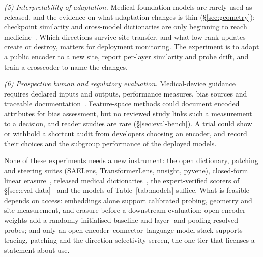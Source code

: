 \textit{(5) Interpretability of adaptation.} Medical foundation models are rarely used as released, and
the evidence on what adaptation changes is thin (\S\ref{sec:geometry}); checkpoint similarity and
cross-model dictionaries are only beginning to reach medicine~\cite{minder2025overcoming,ahmed2026medseglens}.
Which directions survive site transfer, and what low-rank updates create or destroy, matters for
deployment monitoring. The experiment is to adapt a public encoder to a new site, report per-layer
similarity and probe drift, and train a crosscoder to name the changes.

\textit{(6) Prospective human and regulatory evaluation.} Medical-device guidance requires declared
inputs and outputs, performance measures, bias sources and traceable
documentation~\cite{fda2025aiguidance,euaiact2024}. Feature-space methods could document encoded
attributes for bias assessment, but no reviewed study links such a measurement to a decision, and
reader studies are rare (\S\ref{sec:eval-bench}). A trial could show or withhold a shortcut audit from
developers choosing an encoder, and record their choices and the subgroup performance of the deployed
models.

None of these experiments needs a new instrument: the open dictionary, patching and steering
suites (SAELens, TransformerLens, nnsight, pyvene), closed-form linear
erasure~\cite{belrose2023leace}, released medical
dictionaries~\cite{abdulaal2024an,nooralahzadeh2026universal},
the expert-verified scorers of \S\ref{sec:eval-data}~\cite{kim2024transparent} and the models of
Table~\ref{tab:models} suffice. What is feasible depends on access: embeddings alone support calibrated probing, geometry and site measurement, and erasure before
a downstream evaluation; open encoder weights add a randomly initialised baseline and layer- and
pooling-resolved probes; and only an open encoder--connector--language-model stack supports tracing,
patching and the direction-selectivity screen, the one tier that licenses a statement about use.

